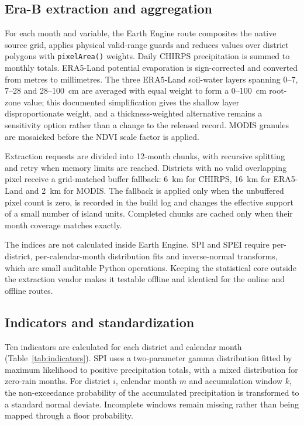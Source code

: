 \documentclass[10pt,a4paper]{article}
\begin{document}
\subsection*{Era-B extraction and aggregation}
For each month and variable, the Earth Engine route composites the native source grid, applies physical valid-range guards and reduces values over district polygons with \texttt{pixelArea()} weights. Daily CHIRPS precipitation is summed to monthly totals. ERA5-Land potential evaporation is sign-corrected and converted from metres to millimetres. The three ERA5-Land soil-water layers spanning 0--7, 7--28 and 28--100~cm are averaged with equal weight to form a 0--100~cm root-zone value; this documented simplification gives the shallow layer disproportionate weight, and a thickness-weighted alternative remains a sensitivity option rather than a change to the released record. MODIS granules are mosaicked before the NDVI scale factor is applied.

Extraction requests are divided into 12-month chunks, with recursive splitting and retry when memory limits are reached. Districts with no valid overlapping pixel receive a grid-matched buffer fallback: 6~km for CHIRPS, 16~km for ERA5-Land and 2~km for MODIS. The fallback is applied only when the unbuffered pixel count is zero, is recorded in the build log and changes the effective support of a small number of island units. Completed chunks are cached only when their month coverage matches exactly.

The indices are not calculated inside Earth Engine. SPI and SPEI require per-district, per-calendar-month distribution fits and inverse-normal transforms, which are small auditable Python operations. Keeping the statistical core outside the extraction vendor makes it testable offline and identical for the online and offline routes.

\subsection*{Indicators and standardization}
Ten indicators are calculated for each district and calendar month (Table~\ref{tab:indicators}). SPI uses a two-parameter gamma distribution fitted by maximum likelihood to positive precipitation totals, with a mixed distribution for zero-rain months\citep{McKee1993}. For district $i$, calendar month $m$ and accumulation window $k$, the non-exceedance probability of the accumulated precipitation is transformed to a standard normal deviate. Incomplete windows remain missing rather than being mapped through a floor probability.
\end{document}
